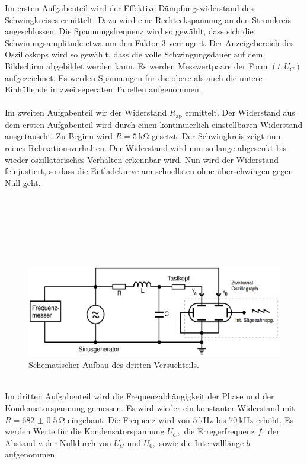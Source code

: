 Im ersten Aufgabenteil wird der Effektive Dämpfungswiderstand des Schwingkreises ermittelt. Dazu wird eine Rechteckspannung an den Stromkreis angeschlossen.
Die Spannungsfrequenz wird so gewählt, dass sich die Schwinungsamplitude etwa um den Faktor 3 verringert. 
Der Anzeigebereich des Oszilloskops wird so gewählt, dass die volle Schwingungsdauer auf dem Bildschirm abgebildet werden kann.
Es werden Messwertpaare der Form $(t, U_C)$ aufgezeichnet. Es werden Spannungen für die obere als auch die untere Einhüllende in zwei seperaten Tabellen aufgenommen.\\
\\
Im zweiten Aufgabenteil wir der Widerstand $R_{\text{ap}}$ ermittelt. Der Widerstand aus dem ersten Aufgabenteil wird durch einen kontinuierlich einstellbaren Widerstand ausgetauscht.
Zu Beginn wird $R = \SI{5}{\kilo\ohm}$ gesetzt. Der Schwingkreis zeigt nun reines Relaxationsverhalten. 
Der Widerstand wird nun so lange abgesenkt bis wieder oszillatorisches Verhalten erkennbar wird. Nun wird
der Widerstand feinjustiert, so dass die Entladekurve am schnellsten ohne überschwingen gegen Null geht.\\
\\
\\
\\
\\
\\
\\
\begin{figure}[h]
    \centering
    \includegraphics[width=\linewidth]{img/Kreis2.png}
    \caption{Schematischer Aufbau des dritten Versuchteils.\cite{V354}}
    \label{fig:Aufbau2}
\end{figure}
\\
Im dritten Aufgabenteil wird die Frequenzabhängigkeit der Phase und der Kondensatorspannung gemessen.
Es wird wieder ein konstanter Widerstand mit $R = \SI{682(0.5)}{\ohm}$ eingebaut. 
Die Frequenz wird von $\SI{5}{\kilo\hertz}$ bis $\SI{70}{\kilo\hertz}$ erhöht. Es werden Werte für die Kondensatorspannung $U_C,$ die Erregerfrequenz $f,$ der Abstand $a$ der Nulldurch von $U_C$ und $U_0,$ sowie die Intervalllänge $b$ aufgenommen.\\
\\